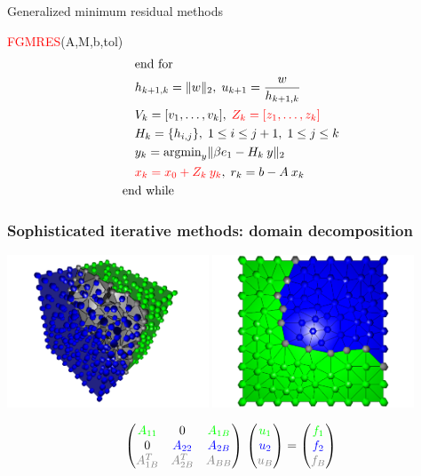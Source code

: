 \documentclass[handout]{beamer}
{
\usepackage{fullpage}
\usepackage{hyperref}
\usepackage{amssymb} 
}
\newcommand{\pmat}[1]{\begin{pmatrix}#1\end{pmatrix}}
\newcommand{\blue}[1]{\textcolor{blue}{#1}}
\newcommand{\green}[1]{\textcolor{green}{#1}}
\newcommand{\gray}[1]{\textcolor{gray}{#1}}
\begin{document}
\begin{frame}{Generalized minimum residual methods}
{\begin{minipage}{0.48\linewidth}
\begin{block}{\footnotesize {\textcolor{red}{FGMRES}(A,M,b,tol)}}
\begin{align*}
   &\quad \text{end for} \\
   &\quad h_{k+1,k} = \Vert w \Vert_2, \; u_{k+1} = \frac{w}{h_{k+1,k}} \\
   &\quad V_k = [v_1, \ldots, v_k], \; \textcolor{red}{Z_k = [z_1, \ldots, z_k]} \\ 
   &\quad H_k = \{h_{i,j}\}, \; 1\le i \le j+1, \; 1 \le j \le k \\
   &\quad y_k = \text{argmin}_y \Vert \beta e_1 - H_k \:  y \Vert_2 \\
   &\quad \textcolor{red}{x_k = x_0 + Z_k \: y_k}, \; r_k = b-A \: x_k \\
   &\text{end while}
\end{align*}
\end{block}
\end{minipage}
}
\end{frame}



\begin{frame}
\frametitle{Sophisticated iterative methods: domain decomposition}

\begin{center}
  \includegraphics[width=6.0cm]{figures/3Ddomain-2parts.pdf}
  \hspace*{-1.0cm}
  \includegraphics[width=6.0cm]{figures/2subdomain.pdf}
\end{center}
\Large{
\[
\pmat
{
  \green{A_{11}}    & 0         & \green{A_{1B}} \\
  0         & \blue{A_{22}}     & \blue{A_{2B}}  \\
  \gray{A_{1B}^T}  & \gray{A_{2B}^T}  & \gray{A_{BB}}
}
\,
\pmat
{
  \green{u_1} \\
  \blue{u_2}  \\
  \gray{u_B}
}
=
\pmat
{
  \green{f_1} \\
  \blue{f_2}  \\
  \gray{f_B}
}
\]}
\end{frame}
\end{document}
